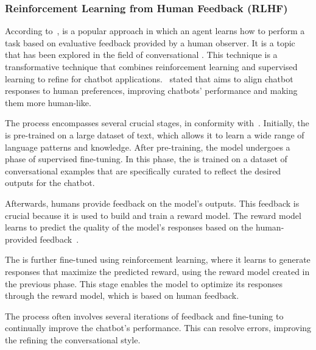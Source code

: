 



\subsubsection{Reinforcement Learning from Human Feedback (RLHF)}

According to~\citet{li_human-centered_2019}, {\rlhf} is a popular approach in which an agent learns how to perform a task based on evaluative feedback provided by a human observer. It is a topic that has been explored in the field of conversational {\ai}. This technique is a transformative technique that combines reinforcement learning and supervised learning to refine {\llm} for chatbot applications.~\citet{tran_enhancing_2023} stated that {\rlhf} aims to align chatbot responses to human preferences, improving chatbots' performance and making them more human-like.

The process encompasses several crucial stages, in conformity with~\citet{axelsson_modeling_2022}. Initially, the {\llm} is pre-trained on a large dataset of text, which allows it to learn a wide range of language patterns and knowledge. After pre-training, the model undergoes a phase of supervised fine-tuning. In this phase, the {\llm} is trained on a dataset of conversational examples that are specifically curated to reflect the desired outputs for the chatbot. 

Afterwards, humans provide feedback on the model's outputs. This feedback is crucial because it is used to build and train a reward model. The reward model learns to predict the quality of the model's responses based on the human-provided feedback~\cite{axelsson_modeling_2022}.

The {\llm} is further fine-tuned using reinforcement learning, where it learns to generate responses that maximize the predicted reward, using the reward model created in the previous phase. This stage enables the model to optimize its responses through the reward model, which is based on human feedback.

The process often involves several iterations of feedback and fine-tuning to continually improve the chatbot's performance. This can resolve errors, improving the refining the conversational style.



